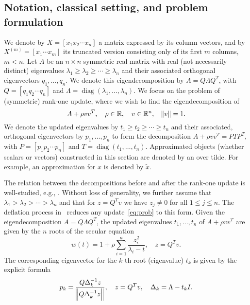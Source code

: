 \documentclass[11pt]{article}
\DeclareMathOperator{\diag}{diag}
\begin{document}
\subsection{Notation, classical setting, and problem formulation} \label{subsec:notation_rank_one_update}
We denote by $X = [x_1x_2 \cdots x_n]$ a matrix expressed by its column vectors, and by $X^{(m)} = [x_1\cdots x_m]$ its truncated version consisting only of its first $m$ columns, $m<n$. Let $A$ be an $n \times n$ symmetric real matrix with real (not necessarily distinct) eigenvalues $\lambda_1 \ge \lambda_2 \ge \cdots \ge \lambda_n$ and their associated orthogonal eigenvectors $q_1,\ldots,q_n$. We denote this eigendecomposition by $A = Q\Lambda Q^T$, with $Q = [q_1q_2 \cdots q_n]$ and $\Lambda = \diag (\lambda_1, \ldots,\lambda_n)$. We focus on the problem of (symmetric) rank-one update, where we wish to find the eigendecomposition of 
\begin{equation} \label{eq:prob}
A + \rho vv^T, \quad \rho \in \mathbb{R}, \quad  v \in \mathbb{R}^n,  \quad  \norm{v} = 1.
\end{equation}
We denote the updated eigenvalues by $t_1 \ge t_2 \ge \cdots \ge t_n$ and their associated, orthogonal eigenvectors by $p_1,\ldots,p_n$ to form the decomposition $A + \rho vv^T = PTP^T$, with $P = [p_1p_2 \cdots p_n]$ and $T = \diag (t_1, \ldots,t_n)$. Approximated objects (whether scalars or vectors) constructed in this section are denoted by an over tilde. For example, an approximation for $x$ is denoted by $\widetilde{x}$.

The relation between the decompositions before and after the rank-one update is well-studied, e.g., \cite{bunch1978rank, ding2007eigenvalues}. Without loss of generality, we further assume that $\lambda_1 > \lambda_2 > \cdots > \lambda_n$ and that for $z = Q^Tv$ we have $z_j \neq 0$ for all $1 \leq j \leq n$. The deflation process in~\cite{bunch1978rank} reduces any update~\eqref{eq:prob} to this form.  Given the eigendecomposition $A = Q\Lambda Q^T$, the updated eigenvalues $t_1,...,t_n$ of $A + \rho v v^T$ are given by the $n$ roots of the secular equation
\begin{equation} \label{eqn:secular_equation}
w(t) = 1 + \rho \sum_{i=1}^{n}\frac{z_i^2}{\lambda_i - t} , \quad  z = Q^Tv.
\end{equation}
The corresponding eigenvector for the $k$-th root (eigenvalue) $t_k$ is given by the explicit formula
\begin{equation}  \label{eqn:EigenvaectorFormula}
p_k = \frac{Q\Delta_k^{-1}z}{\norm{Q\Delta_k^{-1}z}} , \quad  z = Q^Tv , \quad  \Delta_k = \Lambda - t_k I .
\end{equation}
\end{document}
